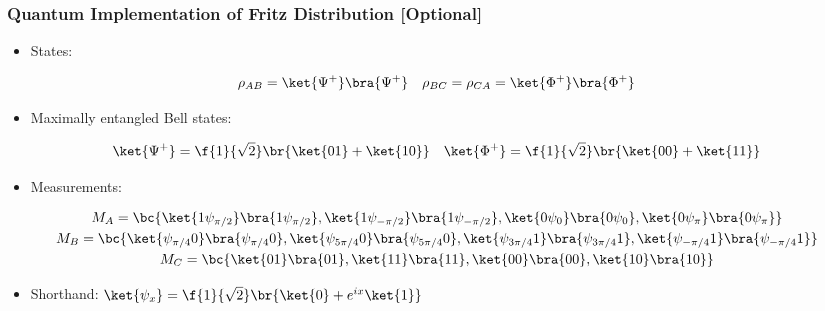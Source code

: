 \documentclass[
    hyperref={bookmarks=false},%
    xcolor={dvipsnames},
]{beamer}
\begin{document}
\begin{frame}
    \frametitle{Quantum Implementation of Fritz Distribution [Optional]}
    \begin{itemize}
        \item States:
    \end{itemize}
    \begin{gather*}
        \rho_{AB} = \ket{\Psi^+}\bra{\Psi^+} \quad \rho_{BC} = \rho_{CA} = \ket{\Phi^+}\bra{\Phi^+}
    \end{gather*}
    \begin{itemize}
        \item Maximally entangled Bell states:
    \end{itemize}
    \[ \ket{\Psi^+} = \f{1}{\sqrt{2}}\br{\ket{01} + \ket{10}} \quad \ket{\Phi^+} = \f{1}{\sqrt{2}}\br{\ket{00} + \ket{11}} \]
    \begin{itemize}
        \item Measurements:
    \end{itemize}
    \begin{gather*}
        M_{A} = \bc{\ket{1\psi_{\pi/2}}\bra{1\psi_{\pi/2}}, \ket{1\psi_{-\pi/2}}\bra{1\psi_{-\pi/2}}, \ket{0\psi_0}\bra{0\psi_0}, \ket{0\psi_{\pi}}\bra{0\psi_{\pi}}} \\
        M_{B} = \bc{\ket{\psi_{\pi/4}0}\bra{\psi_{\pi/4}0}, \ket{\psi_{5\pi/4}0}\bra{\psi_{5\pi/4}0}, \ket{\psi_{3\pi/4}1}\bra{\psi_{3\pi/4}1}, \ket{\psi_{-\pi/4}1}\bra{\psi_{-\pi/4}1}} \\
        M_{C} = \bc{\ket{01}\bra{01}, \ket{11}\bra{11}, \ket{00}\bra{00}, \ket{10}\bra{10}}
    \end{gather*}
    \begin{itemize}
        \item Shorthand: $\ket{\psi_x} = \f{1}{\sqrt{2}}\br{\ket{0} + e^{ix}\ket{1}}$
    \end{itemize}
\end{frame}
\end{document}
